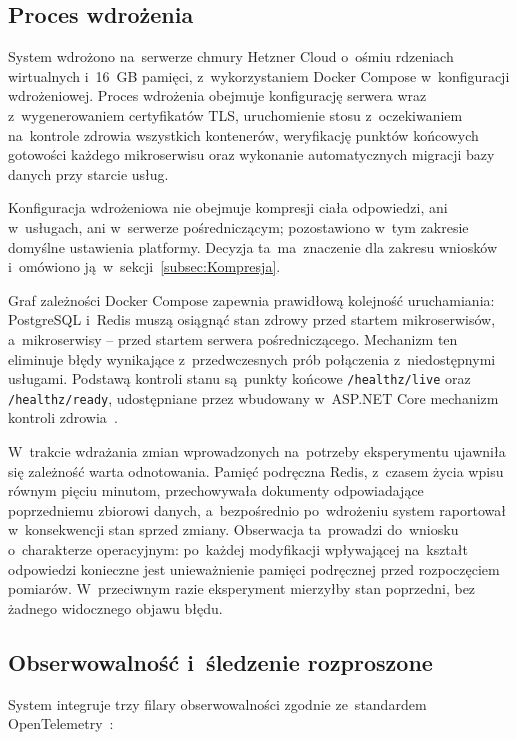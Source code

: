 \subsection{Proces wdrożenia}
\label{subsec:Deployment}

System wdrożono na~serwerze chmury Hetzner Cloud o~ośmiu rdzeniach wirtualnych i~16~GB pamięci, z~wykorzystaniem Docker Compose w~konfiguracji wdrożeniowej. Proces wdrożenia obejmuje konfigurację serwera wraz z~wygenerowaniem certyfikatów TLS, uruchomienie stosu z~oczekiwaniem na~kontrole zdrowia wszystkich kontenerów, weryfikację punktów końcowych gotowości każdego mikroserwisu oraz wykonanie automatycznych migracji bazy danych przy starcie usług.

Konfiguracja wdrożeniowa nie obejmuje kompresji ciała odpowiedzi, ani w~usługach, ani w~serwerze pośredniczącym; pozostawiono w~tym zakresie domyślne ustawienia platformy. Decyzja ta~ma~znaczenie dla zakresu wniosków i~omówiono ją~w~sekcji~\ref{subsec:Kompresja}.

Graf zależności Docker Compose zapewnia prawidłową kolejność uruchamiania: PostgreSQL i~Redis muszą osiągnąć stan zdrowy przed startem mikroserwisów, a~mikroserwisy -- przed startem serwera pośredniczącego. Mechanizm ten eliminuje błędy wynikające z~przedwczesnych prób połączenia z~niedostępnymi usługami. Podstawą kontroli stanu są~punkty końcowe \texttt{/healthz/live} oraz \texttt{/healthz/ready}, udostępniane przez wbudowany w~ASP.NET Core mechanizm kontroli zdrowia~\cite{bib:MicrosoftDocs2024}.

W~trakcie wdrażania zmian wprowadzonych na~potrzeby eksperymentu ujawniła się zależność warta odnotowania. Pamięć podręczna Redis, z~czasem życia wpisu równym pięciu minutom, przechowywała dokumenty odpowiadające poprzedniemu zbiorowi danych, a~bezpośrednio po~wdrożeniu system raportował w~konsekwencji stan sprzed zmiany. Obserwacja ta~prowadzi do~wniosku o~charakterze operacyjnym: po~każdej modyfikacji wpływającej na~kształt odpowiedzi konieczne jest unieważnienie pamięci podręcznej przed rozpoczęciem pomiarów. W~przeciwnym razie eksperyment mierzyłby stan poprzedni, bez żadnego widocznego objawu błędu.

\subsection{Obserwowalność i~śledzenie rozproszone}
\label{subsec:Observability}

System integruje trzy filary obserwowalności zgodnie ze~standardem OpenTelemetry~\cite{bib:OpenTelemetry2024}:

